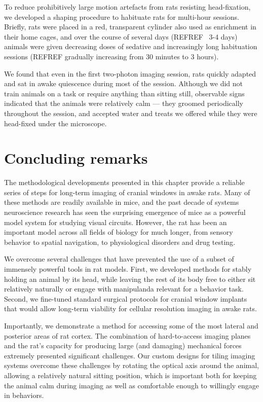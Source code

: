 
To reduce prohibitively large motion artefacts from rats resisting head-fixation, we developed a shaping procedure to habituate rats for multi-hour sessions. Briefly, rats were placed in a red, transparent cylinder also used as enrichment in their home cages, and over the course of several days (REFREF ~3-4 days) animals were given decreasing doses of sedative and increasingly long habituation sessions (REFREF gradually increasing from 30 minutes to 3 hours).

We found that even in the first two-photon imaging session, rats quickly adapted and sat in awake quiescence during most of the session. Although we did not train animals on a task or require anything than sitting still, observable signs indicated that the animals were relatively calm --- they groomed periodically throughout the session, and accepted water and treats we offered while they were head-fixed under the microscope. 

\section{Concluding remarks}
The methodological developments presented in this chapter provide a reliable series of steps for long-term imaging of cranial windows in awake rats. Many of these methods are readily available in mice, and the past decade of systems neuroscience research has seen the surprising emergence of mice as a powerful model system for studying visual circuits. However, the rat has been an important model across all fields of biology for much longer, from sensory behavior\cite{Lashley1930, REFREF} to spatial navigation\cite{REFREF}, to physiological disorders and drug testing\cite{REFREF}. 

We overcome several challenges that have prevented the use of a subset of immensely powerful tools in rat models. First, we developed methods for stably holding an animal by its head, while leaving the rest of its body free to either sit relatively naturally or engage with manipulanda relevant for a behavior task. Second, we fine-tuned standard surgical protocols for cranial window implants that would allow long-term viability for cellular resolution imaging in awake rats. 

Importantly, we demonstrate a method for accessing some of the most lateral and posterior areas of rat cortex. The combination of hard-to-access imaging planes and the rat's capacity for producing large (and damaging) mechanical forces extremely presented significant challenges. Our custom designs for tiling imaging systems overcome these challenges by rotating the optical axis around the animal, allowing a relatively natural sitting position, which is important both for keeping the animal calm during imaging as well as comfortable enough to willingly engage in behaviors. 

